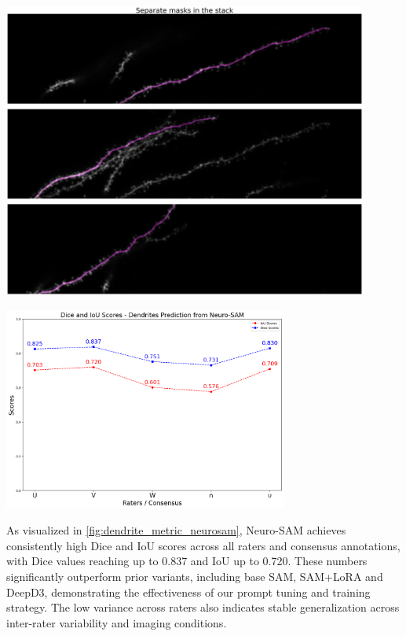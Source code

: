 \begin{center}
\includegraphics[width=0.9\textwidth]{figures/34_separate_masks.png}
\label{fig:separate_masks}
\end{center}

\begin{center}
\includegraphics[width=0.7\textwidth]{figures/35_dendrite_metric_neurosam.png}
\label{fig:dendrite_metric_neurosam}
\end{center}

As visualized in \autoref{fig:dendrite_metric_neurosam}, Neuro-\gls{SAM} achieves consistently high Dice and \gls{IoU} scores across all raters and consensus annotations, with Dice values reaching up to 0.837 and \gls{IoU} up to 0.720. These numbers significantly outperform prior variants, including base \gls{SAM}, \gls{SAM}+\gls{LoRA} and \gls{DeepD3}, demonstrating the effectiveness of our prompt tuning and training strategy. The low variance across raters also indicates stable generalization across inter-rater variability and imaging conditions.



